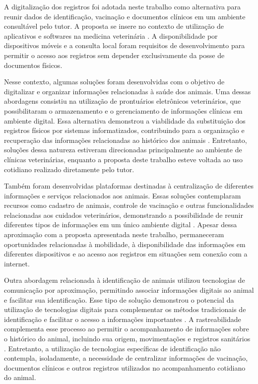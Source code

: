 \documentclass{UNESC}
\begin{document}
A digitalização dos registros foi adotada neste trabalho como alternativa para reunir dados de identificação, vacinação e documentos clínicos em um ambiente consultável pelo tutor. A proposta se insere no contexto de utilização de aplicativos e softwares na medicina veterinária \cite{MORAES2024}. A disponibilidade por dispositivos móveis e a consulta local foram requisitos de desenvolvimento para permitir o acesso aos registros sem depender exclusivamente da posse de documentos físicos.

Nesse contexto, algumas soluções foram desenvolvidas com o objetivo de digitalizar e organizar informações relacionadas à saúde dos animais. Uma dessas abordagens consistiu na utilização de prontuários eletrônicos veterinários, que possibilitaram o armazenamento e o gerenciamento de informações clínicas em ambiente digital. Essa alternativa demonstrou a viabilidade da substituição dos registros físicos por sistemas informatizados, contribuindo para a organização e recuperação das informações relacionadas ao histórico dos animais \cite{iskandar2023}. Entretanto, soluções dessa natureza estiveram direcionadas principalmente ao ambiente de clínicas veterinárias, enquanto a proposta deste trabalho esteve voltada ao uso cotidiano realizado diretamente pelo tutor.

Também foram desenvolvidas plataformas destinadas à centralização de diferentes informações e serviços relacionados aos animais. Essas soluções contemplaram recursos como cadastro de animais, controle de vacinação e outras funcionalidades relacionadas aos cuidados veterinários, demonstrando a possibilidade de reunir diferentes tipos de informações em um único ambiente digital \cite{vieira2025}. Apesar dessa aproximação com a proposta apresentada neste trabalho, permaneceram oportunidades relacionadas à mobilidade, à disponibilidade das informações em diferentes dispositivos e ao acesso aos registros em situações sem conexão com a internet.

Outra abordagem relacionada à identificação de animais utilizou tecnologias de comunicação por aproximação, permitindo associar informações digitais ao animal e facilitar sua identificação. Esse tipo de solução demonstrou o potencial da utilização de tecnologias digitais para complementar os métodos tradicionais de identificação e facilitar o acesso a informações importantes \cite{sartori2018}. A rastreabilidade complementa esse processo ao permitir o acompanhamento de informações sobre o histórico do animal, incluindo sua origem, movimentações e registros sanitários \cite{zhao2020}. Entretanto, a utilização de tecnologias específicas de identificação não contempla, isoladamente, a necessidade de centralizar informações de vacinação, documentos clínicos e outros registros utilizados no acompanhamento cotidiano do animal.
\end{document}
